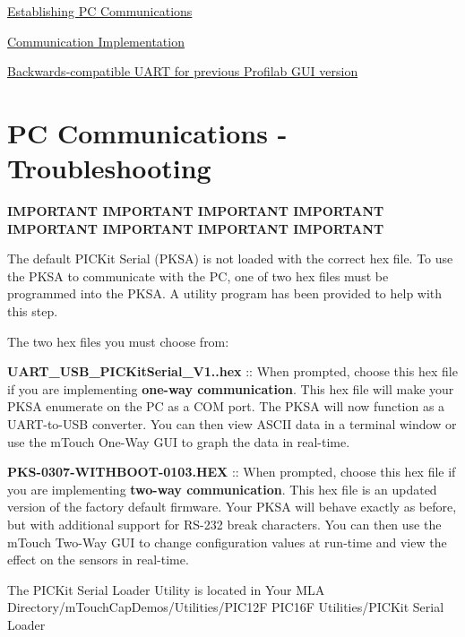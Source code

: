 \begin{DoxyItemize}
\item \hyperlink{ts-Comms}{Establishing P\+C Communications} \item \hyperlink{digCom}{Communication Implementation} \item \hyperlink{BCPGUI}{Backwards-\/compatible U\+A\+R\+T for previous Profilab G\+U\+I version} \end{DoxyItemize}
\hypertarget{ts-Comms}{}\section{P\+C Communications -\/ Troubleshooting}\label{ts-Comms}
\begin{center} \begin{TabularC}{1}
\hline
\begin{center}{\bfseries I\+M\+P\+O\+R\+T\+A\+N\+T I\+M\+P\+O\+R\+T\+A\+N\+T I\+M\+P\+O\+R\+T\+A\+N\+T I\+M\+P\+O\+R\+T\+A\+N\+T I\+M\+P\+O\+R\+T\+A\+N\+T I\+M\+P\+O\+R\+T\+A\+N\+T I\+M\+P\+O\+R\+T\+A\+N\+T I\+M\+P\+O\+R\+T\+A\+N\+T}\end{center} 

The default P\+I\+C\+Kit Serial (P\+K\+S\+A) is not loaded with the correct hex file. To use the P\+K\+S\+A to communicate with the P\+C, one of two hex files must be programmed into the P\+K\+S\+A. A utility program has been provided to help with this step.

The two hex files you must choose from\+: \begin{DoxyItemize}
\item {\bfseries U\+A\+R\+T\+\_\+\+U\+S\+B\+\_\+\+P\+I\+C\+Kit\+Serial\+\_\+\+V1..\+hex} \+:\+: When prompted, choose this hex file if you are implementing {\bfseries one-\/way communication}. This hex file will make your P\+K\+S\+A enumerate on the P\+C as a C\+O\+M port. The P\+K\+S\+A will now function as a U\+A\+R\+T-\/to-\/\+U\+S\+B converter. You can then view A\+S\+C\+I\+I data in a terminal window or use the m\+Touch One-\/\+Way G\+U\+I to graph the data in real-\/time. \item {\bfseries P\+K\+S-\/0307-\/\+W\+I\+T\+H\+B\+O\+O\+T-\/0103.\+H\+E\+X} \+:\+: When prompted, choose this hex file if you are implementing {\bfseries two-\/way communication}. This hex file is an updated version of the factory default firmware. Your P\+K\+S\+A will behave exactly as before, but with additional support for R\+S-\/232 break characters. You can then use the m\+Touch Two-\/\+Way G\+U\+I to change configuration values at run-\/time and view the effect on the sensors in real-\/time.\end{DoxyItemize}
The P\+I\+C\+Kit Serial Loader Utility is located in {\ttfamily Your M\+L\+A Directory/m\+Touch\+Cap\+Demos/\+Utilities/\+P\+I\+C12\+F P\+I\+C16\+F Utilities/\+P\+I\+C\+Kit Serial Loader}


\end{TabularC}
\end{center}
